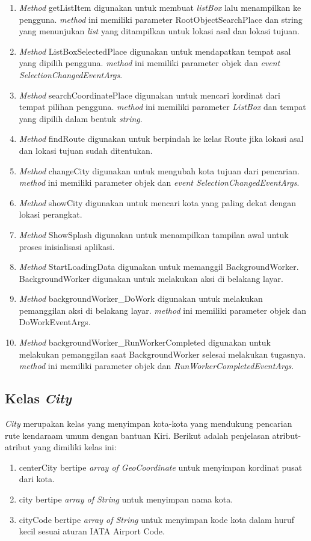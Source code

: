 \begin{enumerate}
	\item \textit{Method} getListItem digunakan untuk membuat \textit{listBox} lalu menampilkan ke pengguna. \textit{method} ini memiliki parameter RootObjectSearchPlace dan string yang menunjukan \textit{list} yang ditampilkan untuk lokasi asal dan lokasi tujuan. 
	\item \textit{Method} ListBoxSelectedPlace digunakan untuk mendapatkan tempat asal yang dipilih pengguna. \textit{method} ini memiliki parameter objek dan \textit{event SelectionChangedEventArgs}. 
	\item \textit{Method} searchCoordinatePlace digunakan untuk mencari kordinat dari tempat pilihan pengguna. \textit{method} ini memiliki parameter \textit{ListBox} dan tempat yang dipilih dalam bentuk \textit{string}.
	\item \textit{Method} findRoute digunakan untuk berpindah ke kelas Route jika lokasi asal dan lokasi tujuan sudah ditentukan.
	\item \textit{Method} changeCity digunakan untuk mengubah kota tujuan dari pencarian. \textit{method} ini memiliki parameter objek dan \textit{event SelectionChangedEventArgs}.
	\item \textit{Method} showCity digunakan untuk mencari kota yang paling dekat dengan lokasi perangkat.
	\item \textit{Method} ShowSplash digunakan untuk menampilkan tampilan awal untuk proses inisialisasi aplikasi.
	\item \textit{Method} StartLoadingData digunakan untuk memanggil BackgroundWorker. BackgroundWorker digunakan untuk melakukan aksi di belakang layar.
	\item \textit{Method} backgroundWorker\_DoWork digunakan untuk melakukan pemanggilan aksi di belakang layar. \textit{method} ini memiliki parameter objek dan DoWorkEventArgs.
	\item \textit{Method} backgroundWorker\_RunWorkerCompleted digunakan untuk melakukan pemanggilan saat BackgroundWorker selesai melakukan tugasnya. \textit{method} ini memiliki parameter objek dan \textit{RunWorkerCompletedEventArgs}.
\end{enumerate}

\subsection{Kelas \textit{City}}
\label{lab:Kelas City}
\hspace{0.5cm} \textit{City} merupakan kelas yang menyimpan kota-kota yang mendukung pencarian rute kendaraam umum dengan bantuan Kiri. Berikut adalah penjelasan atribut-atribut yang dimiliki kelas ini:
\begin{enumerate}
	\item centerCity bertipe \textit{array of GeoCoordinate} untuk menyimpan kordinat pusat dari kota.
	\item city bertipe \textit{array of String} untuk menyimpan nama kota.
	\item cityCode bertipe \textit{array of String} untuk menyimpan kode kota dalam huruf kecil sesuai aturan IATA Airport Code. 
\end{enumerate}

